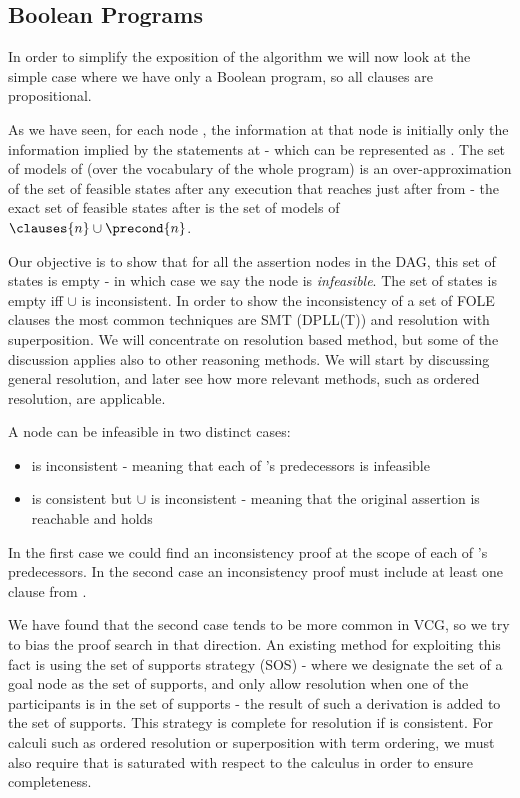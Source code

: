 \subsection{Boolean Programs}
In order to simplify the exposition of the algorithm we will now look at the simple case where we have only a Boolean program, so all clauses are propositional.

As we have seen, for each node , the information at that node is initially only the information implied by the statements at  - which can be represented as .
The set of models of  (over the vocabulary of the whole program) is an over-approximation of the set of feasible states after any execution that reaches just after  from  - 
the exact set of feasible states after  is the set of models of $\clauses{n}\cup\precond{n}$.

Our objective is to show that for all the assertion nodes in the DAG, this set of states is empty - in which case we say the node is \emph{infeasible}.
The set of states is empty iff $\cup$ is inconsistent.
In order to show the inconsistency of a set of FOLE clauses the most common techniques are SMT (DPLL(T)) and resolution with superposition.
We will concentrate on resolution based method, but some of the discussion applies also to other reasoning methods.
We will start by discussing general resolution, and later see how more relevant methods, such as ordered resolution, are applicable.

A node  can be infeasible in two distinct cases:
\begin{itemize}
	\item {} is inconsistent - meaning that each of 's predecessors is infeasible
	\item {} is consistent but $\cup$ is inconsistent - meaning that the original assertion is reachable and holds
\end{itemize}

In the first case we could find an inconsistency proof at the scope of each of 's predecessors.
In the second case an inconsistency proof must include at least one clause from .

We have found that the second case tends to be more common in VCG, so we try to bias the proof search in that direction.
An existing method for exploiting this fact is using the set of supports strategy (SOS) - where we designate the set  of a goal node  as the set of supports, and only allow resolution when one of the participants is in the set of supports - the result of such a derivation is added to the set of supports. 
This strategy is complete for resolution if  is consistent. 
For calculi such as ordered resolution or superposition with term ordering, we must also require that  is saturated with respect to the calculus in order to ensure completeness.

